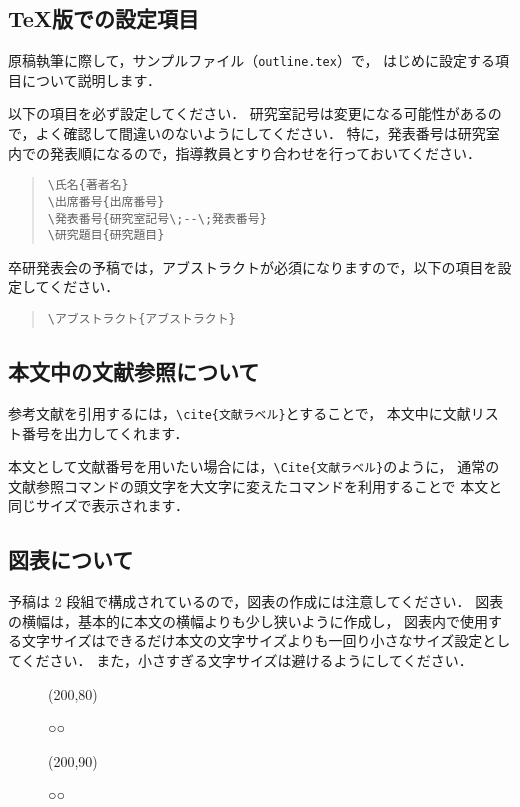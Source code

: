 \documentclass[titlepage]{jarticle}
\begin{document}
\subsection{\TeX 版での設定項目}
%
原稿執筆に際して，サンプルファイル（\texttt{outline.tex}）で，
はじめに設定する項目について説明します．

以下の項目を必ず設定してください．
研究室記号は変更になる可能性があるので，よく確認して間違いのないようにしてください．
特に，発表番号は研究室内での発表順になるので，指導教員とすり合わせを行っておいてください．
%
\begin{quote}
  \verb|\氏名{著者名}| \\
  \verb|\出席番号{出席番号}| \\
  \verb|\発表番号{研究室記号\;--\;発表番号}| \\
  \verb|\研究題目{研究題目}|
\end{quote}
%
卒研発表会の予稿では，アブストラクトが必須になりますので，以下の項目を設定してください．
%
\begin{quote}
  \verb|\アブストラクト{アブストラクト}|
\end{quote}
%
%
%
\subsection{本文中の文献参照について}
%
参考文献を引用するには，\verb|\cite{文献ラベル}|とすることで，
本文中に文献リスト番号を出力してくれます．

本文として文献番号を用いたい場合には，\verb|\Cite{文献ラベル}|のように，
通常の文献参照コマンドの頭文字を大文字に変えたコマンドを利用することで
本文と同じサイズで表示されます．
%
%
\subsection{図表について}
%
予稿は 2 段組で構成されているので，図表の作成には注意してください．
図表の横幅は，基本的に本文の横幅よりも少し狭いように作成し，
図表内で使用する文字サイズはできるだけ本文の文字サイズよりも一回り小さなサイズ設定としてください．
また，小さすぎる文字サイズは避けるようにしてください．
%
\begin{figure}[h!]
  \centering
  \framebox(200,80){}
  \caption{○○}
  \label{fig:ex_fig1}
\end{figure}
%
%
\begin{figure}[h!]
  \centering
  \framebox(200,90){}
  \caption{○○}
  \label{fig:ex_fig2}
\end{figure}
%
%
%
\end{document}

